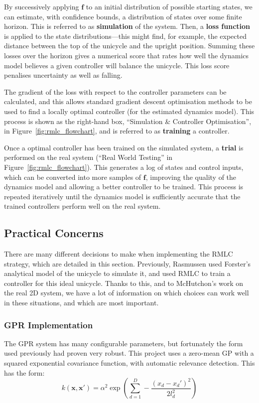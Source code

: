 \documentclass{IIBproject}
\begin{document}
By successively applying $\boldsymbol{f}$ to an initial distribution of
possible starting states, we can estimate, with confidence bounds, a
distribution of states over some finite horizon. This is referred to as
\textbf{simulation} of the system. Then, a \textbf{loss function} is applied
to the state distributions---this might find, for example, the expected
distance between the top of the unicycle and the upright position.  Summing
these losses over the horizon gives a numerical score that rates how well the
dynamics model believes a given controller will balance the unicycle. This
loss score penalises uncertainty as well as falling.

The gradient of the loss with respect to the controller parameters can be
calculated, and this allows standard gradient descent optimisation methods to
be used to find a locally optimal controller (for the estimated dynamics
model). This process is shown as the right-hand box, ``Simulation \&
Controller Optimisation'', in Figure~\ref{fig:rmlc_flowchart}, and is referred
to as \textbf{training} a controller.

Once a optimal controller has been trained on the simulated system, a
\textbf{trial} is performed on the real system (``Real World Testing'' in
Figure~\ref{fig:rmlc_flowchart}). This generates a log of states and control
inputs, which can be converted into more samples of $\boldsymbol{f}$,
improving the quality of the dynamics model and allowing a better controller
to be trained. This process is repeated iteratively until the dynamics model
is sufficiently accurate that the trained controllers perform well on the real
system.

\subsection{Practical Concerns}

There are many different decisions to make when implementing the RMLC
strategy, which are detailed in this section. Previously, Rasmussen used
Forster's analytical model of the unicycle to simulate it, and used RMLC to
train a controller for this ideal unicycle. Thanks to this, and to McHutchon's
work on the real 2D system, we have a lot of information on which choices can
work well in these situations, and which are most important.

\subsubsection{GPR Implementation}
The GPR system has many configurable parameters, but fortunately the form used
previously had proven very robust. This project uses a zero-mean GP with a
squared exponential covariance function, with automatic relevance detection.
This has the form:
\[
  k(\boldsymbol{x}, \boldsymbol{x}') = \alpha^2 \exp \left(\sum_{d=1}^D -
  \frac{(x_d-x_d')^2}{2 l_d^2}\right)
\]
\end{document}
